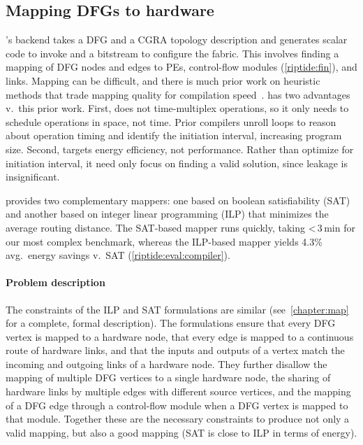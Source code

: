 \subsection{Mapping DFGs to hardware}
\label{riptide:compiler:map}
\riptide's backend takes a DFG and a CGRA topology description and generates
scalar code to invoke \riptide and a bitstream to configure the \riptide fabric.
% 
This involves finding a mapping of DFG nodes and edges to PEs, control-flow modules (\autoref{riptide:fin}), and links.
% 
Mapping can be difficult, and there is much prior work on heuristic methods
that trade mapping quality for compilation speed~\cite{karunaratne2018dnestmap,hamzeh2012epimap,hamzeh2014branch,amp2020,4dcgra,himap,lee2021ultra,chordmap,pathseeker}.
% 
\riptide has two advantages v.\ this prior work.
% 
First, \riptide does not time-multiplex operations, so it only needs to schedule operations in space, not time.
%
Prior compilers unroll loops to reason about operation timing and identify the initiation interval, increasing program size.
% 
Second, \riptide targets energy efficiency, not performance.
% 
Rather than optimize for initiation interval, it need only focus on finding a valid solution, since leakage is insignificant. 

\riptide provides two complementary mappers: one based on boolean satisfiability (SAT) and another based on integer linear programming (ILP) that minimizes the average routing distance.
%
The SAT-based mapper runs quickly, taking <\,3\,min for our most complex benchmark,
whereas the ILP-based mapper yields 4.3\% avg.\ energy savings v.\ SAT (\autoref{riptide:eval:compiler}).

\paragraph{Problem description}
The constraints of the ILP and SAT formulations are similar (see~\autoref{chapter:map} for a complete, formal description).
%
The formulations ensure that every DFG vertex is mapped to a hardware node, that every edge is mapped to a continuous route of hardware links, and that the inputs and outputs of a vertex match the incoming and outgoing links of a hardware node. 
% 
They further disallow the mapping of multiple DFG vertices to a single hardware node, the sharing of hardware links by multiple edges with different source vertices, and the mapping of a DFG edge through a control-flow module when a DFG vertex is mapped to that module.
% 
Together these are the necessary constraints to produce not only a valid mapping, but also a good mapping (SAT is close to ILP in terms of energy).
% 
% 

